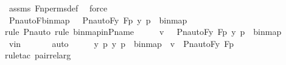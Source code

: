 \begin{isabellebody}
\ assms\ Fn{\isacharunderscore}{\kern0pt}perms{\isacharunderscore}{\kern0pt}def\ \isamarkupfalse%
\ force\isanewline
\isanewline
\ \ \isamarkupfalse%
\ {\isachardoublequoteopen}Pn{\isacharunderscore}{\kern0pt}auto{\isacharparenleft}{\kern0pt}F{\isacharparenright}{\kern0pt}{\isacharbackquote}{\kern0pt}binmap{\isacharprime}{\kern0pt}\ {\isacharequal}{\kern0pt}\ {\isacharbraceleft}{\kern0pt}\ {\isacharless}{\kern0pt}Pn{\isacharunderscore}{\kern0pt}auto{\isacharparenleft}{\kern0pt}F{\isacharparenright}{\kern0pt}{\isacharbackquote}{\kern0pt}y{\isacharcomma}{\kern0pt}\ F{\isacharbackquote}{\kern0pt}p{\isachargreater}{\kern0pt}{\isachardot}{\kern0pt}\ {\isacharless}{\kern0pt}y{\isacharcomma}{\kern0pt}\ p{\isachargreater}{\kern0pt}\ {\isasymin}\ binmap{\isacharprime}{\kern0pt}\ {\isacharbraceright}{\kern0pt}{\isachardoublequoteclose}\ \isanewline
\ \ \ \ \isamarkupfalse%
{\isacharparenleft}{\kern0pt}rule\ Pn{\isacharunderscore}{\kern0pt}auto{\isacharcomma}{\kern0pt}\ rule\ binmap{\isacharprime}{\kern0pt}{\isacharunderscore}{\kern0pt}in{\isacharunderscore}{\kern0pt}P{\isacharunderscore}{\kern0pt}name{\isacharparenright}{\kern0pt}\isanewline
\ \ \isamarkupfalse%
\ \isamarkupfalse%
\ {\isachardoublequoteopen}v\ {\isasymin}\ {\isacharbraceleft}{\kern0pt}\ {\isacharless}{\kern0pt}Pn{\isacharunderscore}{\kern0pt}auto{\isacharparenleft}{\kern0pt}F{\isacharparenright}{\kern0pt}{\isacharbackquote}{\kern0pt}y{\isacharcomma}{\kern0pt}\ F{\isacharbackquote}{\kern0pt}p{\isachargreater}{\kern0pt}{\isachardot}{\kern0pt}\ {\isacharless}{\kern0pt}y{\isacharcomma}{\kern0pt}\ p{\isachargreater}{\kern0pt}\ {\isasymin}\ binmap{\isacharprime}{\kern0pt}\ {\isacharbraceright}{\kern0pt}{\isachardoublequoteclose}\ \isanewline
\ \ \ \ \isamarkupfalse%
\ vin\ \isanewline
\ \ \ \ \isamarkupfalse%
\ auto\isanewline
\ \ \isamarkupfalse%
\ \isamarkupfalse%
\ {\isachardoublequoteopen}{\isasymexists}y\ p{\isachardot}{\kern0pt}\ {\isacharless}{\kern0pt}y{\isacharcomma}{\kern0pt}\ p{\isachargreater}{\kern0pt}\ {\isasymin}\ binmap{\isacharprime}{\kern0pt}\ {\isasymand}\ v\ {\isacharequal}{\kern0pt}\ {\isacharless}{\kern0pt}Pn{\isacharunderscore}{\kern0pt}auto{\isacharparenleft}{\kern0pt}F{\isacharparenright}{\kern0pt}{\isacharbackquote}{\kern0pt}y{\isacharcomma}{\kern0pt}\ F{\isacharbackquote}{\kern0pt}p{\isachargreater}{\kern0pt}{\isachardoublequoteclose}\ \isanewline
\ \ \ \ \isamarkupfalse%
{\isacharparenleft}{\kern0pt}rule{\isacharunderscore}{\kern0pt}tac\ pair{\isacharunderscore}{\kern0pt}rel{\isacharunderscore}{\kern0pt}arg{\isacharparenright}{\kern0pt}\isanewline

\end{isabellebody}
